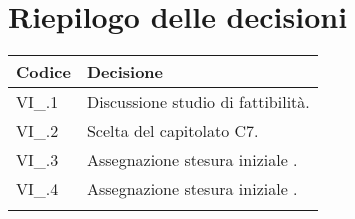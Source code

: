 \section{Riepilogo delle decisioni \hfil}
{
	\setlength{\freewidth}{\dimexpr\textwidth-4\tabcolsep}
	\renewcommand{\arraystretch}{1.5}
	\setlength{\aboverulesep}{0pt}
	\setlength{\belowrulesep}{0pt}
	\begin{longtable}{L{.3\freewidth} L{.7\freewidth}}
		\toprule 
		\textbf{Codice} & \textbf{Decisione}\\
		\toprule
		\endhead
		
		VI\_\DataMeeting{}.1 & Discussione studio di fattibilità. \\  
		VI\_\DataMeeting{}.2 & Scelta del capitolato C7. \\
		VI\_\DataMeeting{}.3 & Assegnazione stesura iniziale \SdF. \\ 
		VI\_\DataMeeting{}.4 & Assegnazione stesura iniziale \NdP.   \\
		
		\bottomrule
		\hiderowcolors
	\end{longtable}
}